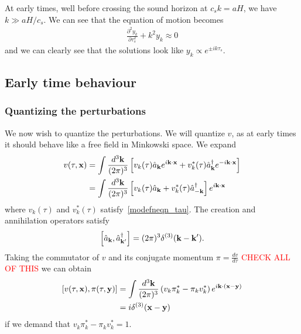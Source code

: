     At early times, well before crossing the sound horizon at $c_sk=aH$,
    we have $k\gg aH/c_s$. We can see that the equation of motion becomes
    \begin{align}
        \frac{\partial^2 y_k}{\partial \tau_s^2} + k^2 y_k \approx 0
    \end{align}
    and we can clearly see that the solutions look like $y_k\propto e^{\pm ik\tau_s}$.


    \subsection{Early time behaviour}
    \subsubsection{Quantizing the perturbations}
    We now wish to quantize the perturbations.
    We will quantize $v$,
    as at early times it should behave like a free field in Minkowski space.
    We expand
    \begin{align}\label{operator_expansion}
        v(\tau,\mathbf{x}) &= \int\frac{d^3\mathbf{k}}{(2\pi)^3}\left[
            v_k(\tau)\hat{a}_{\mathbf{k}} e^{i\mathbf{k}\cdot\mathbf{x}}+
            v^*_k(\tau)\hat{a}^{\dagger}_{\mathbf{k}} e^{-i\mathbf{k}\cdot\mathbf{x}}
        \right]\\
            &= \int\frac{d^3\mathbf{k}}{(2\pi)^3}\left[
            v_k(\tau)\hat{a}_{\mathbf{k}} +
            v^*_k(\tau)\hat{a}^{\dagger}_{-\mathbf{k}}
        \right]e^{i\mathbf{k}\cdot\mathbf{x}}
    \end{align}
    where $v_k(\tau)$ and $v^*_k(\tau)$ satisfy~\eqref{modefneqn_tau}.
    The creation and annihilation operators satisfy
    \begin{align}\label{creation_annihilation_commutator}
        \left[\hat{a}_{\mathbf{k}},\hat{a}^{\dagger}_{\mathbf{k}'}\right] = (2\pi)^3\delta^{(3)}(\mathbf{k}-\mathbf{k}').
    \end{align}
    Taking the commutator of $v$ and its conjugate momentum $\pi=\frac{dv}{d\tau}$
    \textcolor{red}{CHECK ALL OF THIS}
    we can obtain
    \begin{align}
        \left[v(\tau,\mathbf{x}),\pi(\tau,\mathbf{y})\right] &=
        \int \frac{d^3 \mathbf{k}}{(2\pi)^3}\left(v_k\pi^*_k-\pi_kv^*_k\right)e^{i\mathbf{k}\cdot(\mathbf{x}-\mathbf{y})}\\
        &= i \delta^{(3)}(\mathbf{x}-\mathbf{y})
    \end{align}
    if we demand that $v_k\pi^*_k-\pi_kv^*_k=1$.


